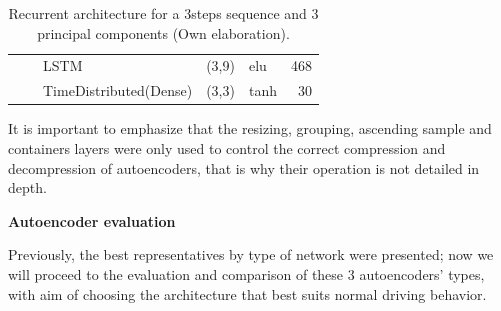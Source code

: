 \begin{table}[H]
\begin{center}
\begin{tabular}{ll|l|r|l|r|}
\multicolumn{1}{|l|}{}                              &                             & LSTM                               & (3,9)                                & elu                                     & 468                                         \\ \cline{3-6} 
\multicolumn{1}{|l|}{}                              &                             & TimeDistributed(Dense)             & (3,3)                                & tanh                                     & 30                                          \\ \hline
\end{tabular}
\end{center}
\caption{Recurrent architecture for a 3\-steps sequence and 3 principal components (Own elaboration).}
\label{table:rnn33}
\end{table}

It is important to emphasize that the resizing, grouping, ascending sample and containers layers were only used to control the correct compression and decompression of autoencoders, that is why their operation is not detailed in depth.

\vspace{5mm} %

\textbf{Autoencoder evaluation}

\vspace{5mm} %

Previously, the best representatives by type of network were presented; now we will proceed to the evaluation and comparison of these 3 autoencoders' types, with aim of choosing the architecture that best suits normal driving behavior.

\vspace{5mm} %

